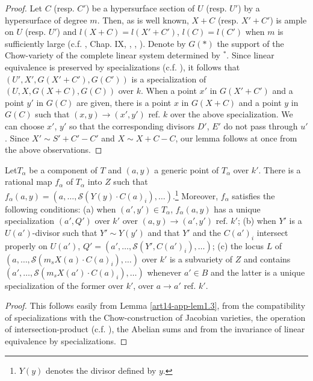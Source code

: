 \begin{proof}
Let $C$ (resp. $C'$) be a hypersurface section of $U$ (resp. $U'$) by a hypersurface of degree $m$. Then, as is well known, $X+C$ (resp. $X'+C'$) is ample on $U$ (resp. $U'$) and $l(X+C)=l(X'+C')$, $l(C)=l(C')$ when $m$ is sufficiently large (c.f. \cite{art14-key25}, Chap. IX, \cite{art14-key31}, \cite{art14-key21}, \cite{art14-key4}). Denote by $G(*)$ the support of the Chow-variety of the complete linear system determined by $^{*}$. Since linear equivalence is preserved by specializations (c.f. \cite{art14-key24}), it follows that $(U',X',G(X'+C'),G(C'))$ is a specialization of $(U,X,G(X+C),G(C))$ over $k$. When a point $x'$ in $G(X'+C')$ and a point $y'$ in $G(C)$ are given, there is a point $x$ in $G(X+C)$ and a point $y$ in $G(C)$ such that $(x,y)\to (x',y')$ ref. $k$ over the above specialization. We can choose $x'$, $y'$ so that the corresponding divisors $D'$, $E'$ do not pass through $u'$. Since $X'\sim S'+C'-C'$ and $X\sim X+C-C$, our lemma follows at once from the above observations. 
\end{proof}

\begin{coro*}
Let\pageoriginale $T_{\alpha}$ be a component of $T$ and $(a,y)$ a generic point of $T_{\alpha}$ over $k'$. There is a rational map $f_{\alpha}$ of $T_{\alpha}$ into $Z$ such that $f_{\alpha}(a,y)=(a,\ldots,\mathscr{S}(Y(y)\cdot C(a)_{i}),\ldots)$.\footnote{$Y(y)$ denotes the divisor defined by $y$.} Moreover, $f_{\alpha}$ satisfies the following conditions: {\rm(a)} when $(a',y')\in T_{\alpha}$, $f_{\alpha}(a,y)$ has a unique specialization $(a',Q')$ over $k'$ over $(a,y)\to (a',y')$ ref. $k'$; {\rm(b)} when $Y'$ is a $U(a')$-divisor such that $Y'\sim Y(y')$ and that $Y'$ and the $C(a')_{i}$ intersect properly on $U(a')$, $Q'=(a',\ldots,\mathscr{S}(Y',C(a')_{i}),\ldots)$; {\rm(c)} the locus $L$ of $(a,\ldots,\mathscr{S}(m_{s}X(a)\cdot C(a)_{i}),\ldots)$ over $k'$ is a subvariety of $Z$ and contains $(a',\ldots,\mathscr{S}(m_{s}X(a')\cdot C(a)_{i}),\ldots)$ whenever $a'\in B$ and the latter is a unique specialization of the former over $k'$, over $a\to a'$ {\rm ref.} $k'$.
\end{coro*}

\begin{proof}
This follows easily from Lemma \ref{art14-app-lem1.3}, from the compatibility of specializations with the Chow-construction of Jacobian varieties, the operation of intersection-product (c.f. \cite{art14-key24}), the Abelian sums and from the invariance of linear equivalence by specializations.
\end{proof}

